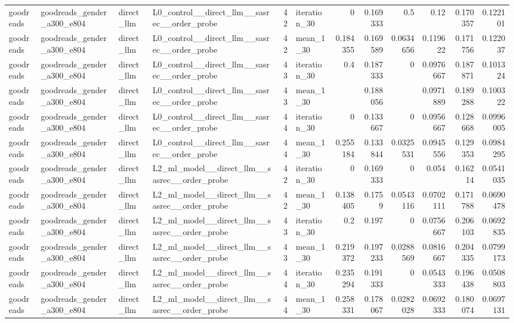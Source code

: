 \begin{table}[htbp!]
\begin{tabular}{llllrlrrrrrr}
goodreads & goodreads\_gender\_a300\_e804 & direct\_llm & L0\_control\_\_direct\_llm\_\_sasrec\_\_order\_probe & 42 & iteration\_30 & 0 & 0.169333 & 0.5 & 0.12 & 0.170357 & 0.122101 \\
goodreads & goodreads\_gender\_a300\_e804 & direct\_llm & L0\_control\_\_direct\_llm\_\_sasrec\_\_order\_probe & 42 & mean\_1\_30 & 0.184355 & 0.169589 & 0.0634656 & 0.119622 & 0.171756 & 0.122037 \\
goodreads & goodreads\_gender\_a300\_e804 & direct\_llm & L0\_control\_\_direct\_llm\_\_sasrec\_\_order\_probe & 43 & iteration\_30 & 0.4 & 0.187333 & 0 & 0.0976667 & 0.187871 & 0.101324 \\
goodreads & goodreads\_gender\_a300\_e804 & direct\_llm & L0\_control\_\_direct\_llm\_\_sasrec\_\_order\_probe & 43 & mean\_1\_30 & \textemdash{} & 0.188056 & \textemdash{} & 0.0971889 & 0.189288 & 0.100322 \\
goodreads & goodreads\_gender\_a300\_e804 & direct\_llm & L0\_control\_\_direct\_llm\_\_sasrec\_\_order\_probe & 44 & iteration\_30 & 0 & 0.133667 & 0 & 0.0956667 & 0.128668 & 0.0996005 \\
goodreads & goodreads\_gender\_a300\_e804 & direct\_llm & L0\_control\_\_direct\_llm\_\_sasrec\_\_order\_probe & 44 & mean\_1\_30 & 0.255184 & 0.133844 & 0.0325531 & 0.0945556 & 0.129353 & 0.0984295 \\
goodreads & goodreads\_gender\_a300\_e804 & direct\_llm & L2\_ml\_model\_\_direct\_llm\_\_sasrec\_\_order\_probe & 42 & iteration\_30 & 0 & 0.169333 & 0 & 0.054 & 0.16214 & 0.0541035 \\
goodreads & goodreads\_gender\_a300\_e804 & direct\_llm & L2\_ml\_model\_\_direct\_llm\_\_sasrec\_\_order\_probe & 42 & mean\_1\_30 & 0.138405 & 0.1759 & 0.0543116 & 0.0702111 & 0.171788 & 0.0690478 \\
goodreads & goodreads\_gender\_a300\_e804 & direct\_llm & L2\_ml\_model\_\_direct\_llm\_\_sasrec\_\_order\_probe & 43 & iteration\_30 & 0.2 & 0.197 & 0 & 0.0756667 & 0.206103 & 0.0692835 \\
goodreads & goodreads\_gender\_a300\_e804 & direct\_llm & L2\_ml\_model\_\_direct\_llm\_\_sasrec\_\_order\_probe & 43 & mean\_1\_30 & 0.219372 & 0.197233 & 0.0288569 & 0.0816667 & 0.204335 & 0.0799173 \\
goodreads & goodreads\_gender\_a300\_e804 & direct\_llm & L2\_ml\_model\_\_direct\_llm\_\_sasrec\_\_order\_probe & 44 & iteration\_30 & 0.235294 & 0.191333 & 0 & 0.0543333 & 0.196438 & 0.0508803 \\
goodreads & goodreads\_gender\_a300\_e804 & direct\_llm & L2\_ml\_model\_\_direct\_llm\_\_sasrec\_\_order\_probe & 44 & mean\_1\_30 & 0.258331 & 0.178067 & 0.0282028 & 0.0692333 & 0.180074 & 0.0697131 \\

\end{tabular}
\end{table}

